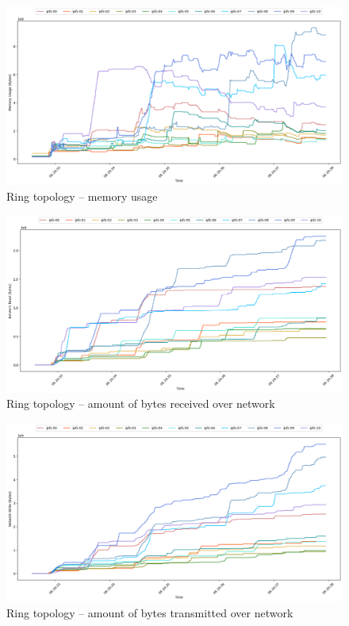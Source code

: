 \begin{figure}[H]
\includegraphics[width=\linewidth]{figures/ring/mem_usage.png}
\caption{Ring topology -- memory usage}
\end{figure}
\begin{figure}[H]
\includegraphics[width=\linewidth]{figures/ring/net_read.png}
\caption{Ring topology -- amount of bytes received over network}
\end{figure}
\begin{figure}[H]
\includegraphics[width=\linewidth]{figures/ring/net_write.png}
\caption{Ring topology -- amount of bytes transmitted over network}
\end{figure}


